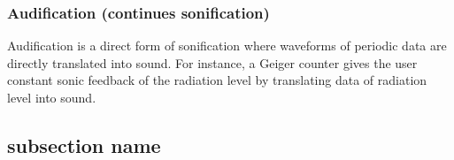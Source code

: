 

\subsubsection*{Audification (continues sonification)} %
\label{ssub:audification_continues_sonification_}

Audification is a direct form of sonification where waveforms of periodic data are directly translated into sound. 
For instance, a Geiger counter gives the user constant sonic feedback of the radiation level by translating data of radiation level into sound.




\subsection{subsection name} %
\label{sub:subsection_name}


